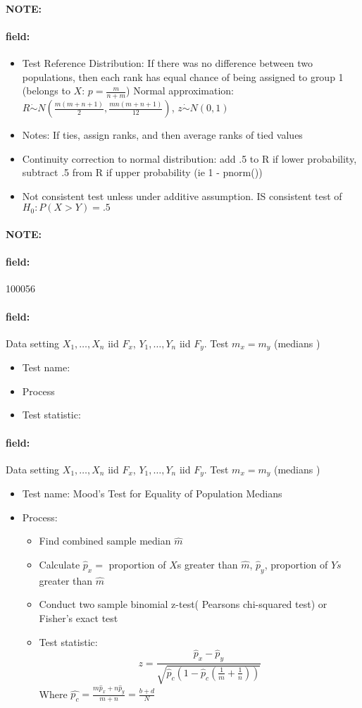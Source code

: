 \documentclass[12pt]{article}
\newenvironment{note}{\paragraph{NOTE:}}{}
\newenvironment{field}{\paragraph{field:}}{}
\begin{document}
\begin{note}
\begin{field}
\begin{itemize}
   \item Test Reference Distribution: If there was no difference between two populations, then each rank has equal chance of being assigned to group 1 (belongs to $X$: $p = \frac{m}{n+m}$)
         Normal approximation: $R \dot\sim N( \frac{m(m+n+1)}{2}, \frac{mn(m+n+1)}{12})$, $z \dot\sim N(0,1)$
   \item Notes: If ties, assign ranks, and then average ranks of tied values
   \item Continuity correction to normal distribution: add .5 to R if lower probability, subtract .5 from R if upper probability (ie 1 - pnorm())
   \item Not consistent test unless under additive assumption. IS consistent test of $H_0: P(X > Y) = .5$
  \end{itemize}
 \end{field}
\end{note}

\begin{note} \begin{field} \tiny 100056 \end{field}
 \begin{field}
  Data setting $X_1, \ldots , X_n$ iid $F_x$, $Y_1, \ldots, Y_n$ iid $F_y$. Test $m_x = m_y$ (medians )
  \begin{itemize}
   \item Test name:
   \item Process
   \item Test statistic:
  \end{itemize}
 \end{field}
 \begin{field}
  Data setting $X_1, \ldots , X_n$ iid $F_x$, $Y_1, \ldots, Y_n$ iid $F_y$. Test $m_x = m_y$ (medians )
  \begin{itemize}
   \item Test name: Mood's Test for Equality of Population Medians
   \item Process:
         \begin{itemize}
          \item Find combined sample median $\hat{m}$
          \item Calculate $\hat{p}_x = $ proportion of $X$s greater than $\hat{m}$, $\hat{p}_y$, proportion of $Ys$ greater than $\hat{m}$
          \item Conduct two sample binomial z-test( Pearsons chi-squared test) or Fisher's exact test
          \item  Test statistic: $$ z = \frac{\hat{p}_x - \hat{p}_y}{\sqrt{\hat{p}_c(1 - \hat{p}_c(\frac{1}{m} + \frac{1}{n}))}} $$ Where $\hat{p_c} = \frac{m\hat{p}_x + n\hat{p}_y}{m+n} = \frac{b + d}{N}$
         \end{itemize}
  \end{itemize}
 \end{field}
\end{note}
\end{document}

